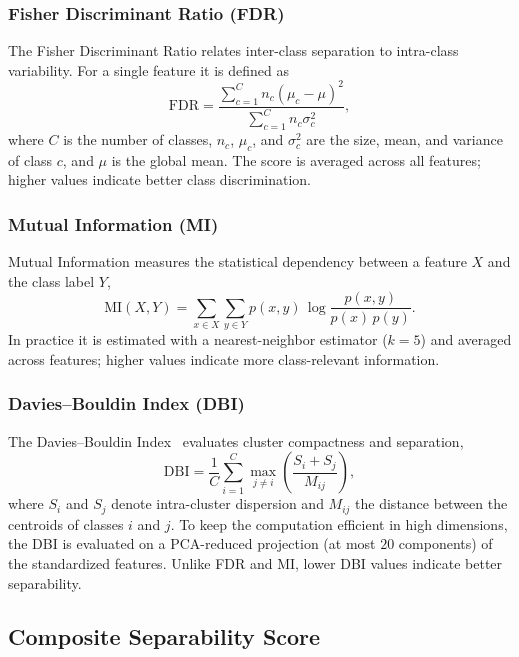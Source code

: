 \subsubsection{Fisher Discriminant Ratio (FDR)}
The Fisher Discriminant Ratio relates inter-class separation to intra-class
variability. For a single feature it is defined as
\begin{equation}
\mathrm{FDR} =
\frac{\sum_{c=1}^{C} n_c (\mu_c - \mu)^2}
     {\sum_{c=1}^{C} n_c \sigma_c^2},
\end{equation}
where $C$ is the number of classes, $n_c$, $\mu_c$, and $\sigma_c^2$ are the
size, mean, and variance of class $c$, and $\mu$ is the global mean. The score
is averaged across all features; higher values indicate better class
discrimination.

\subsubsection{Mutual Information (MI)}
Mutual Information measures the statistical dependency between a feature $X$ and
the class label $Y$,
\begin{equation}
\mathrm{MI}(X,Y) = \sum_{x \in X}\sum_{y \in Y}
p(x,y)\,\log \frac{p(x,y)}{p(x)\,p(y)}.
\end{equation}
In practice it is estimated with a nearest-neighbor estimator
($k=5$) and averaged across features; higher values indicate more
class-relevant information.

\subsubsection{Davies--Bouldin Index (DBI)}
The Davies--Bouldin Index~\cite{davies1979} evaluates cluster compactness and
separation,
\begin{equation}
\mathrm{DBI} = \frac{1}{C}\sum_{i=1}^{C}
\max_{j \neq i}\left(\frac{S_i + S_j}{M_{ij}}\right),
\end{equation}
where $S_i$ and $S_j$ denote intra-cluster dispersion and $M_{ij}$ the distance
between the centroids of classes $i$ and $j$. To keep the computation efficient
in high dimensions, the DBI is evaluated on a PCA-reduced projection (at most
$20$ components) of the standardized features. Unlike FDR and MI, lower DBI
values indicate better separability.

\subsection{Composite Separability Score}
\label{sec:phase1_composite}

